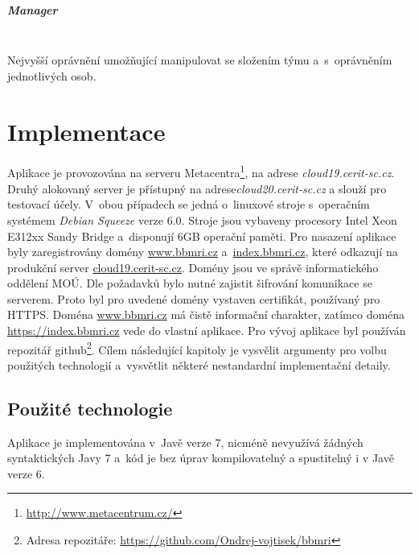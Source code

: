 \documentclass[11pt,draft,oneside]{fithesis2}
\newcommand{\paragraphNewLine}[1]{\paragraph*{#1}\mbox{}\\}
\begin{document}
\paragraphNewLine{Manager}
Nejvyšší oprávnění umožňující manipulovat se složením týmu a~s~oprávněním jednotlivých osob.











\chapter{Implementace}\label{chapter:implementation}
Aplikace je provozována na serveru Metacentra\footnote{\url{http://www.metacentrum.cz/}}, na adrese \textit{cloud19.cerit-sc.cz}. Druhý alokovaný server je přístupný na adrese\textit{cloud20.cerit-sc.cz} a slouží pro testovací účely. V~obou případech se jedná o~linuxové stroje s~operačním systémem \textit{Debian Squeeze} verze 6.0. Stroje jsou vybaveny procesory Intel Xeon E312xx Sandy Bridge a~disponují 6GB operační paměti.
Pro nasazení aplikace byly zaregistrovány domény \url{www.bbmri.cz} a~\url{index.bbmri.cz}, které odkazují na produkční server \url{cloud19.cerit-sc.cz}. Domény jsou ve správě informatického oddělení MOÚ.
Dle požadavků bylo nutné zajistit šifrování komunikace se serverem. Proto byl pro uvedené domény vystaven certifikát, používaný pro HTTPS. 
Doména \url{www.bbmri.cz} má čistě informační charakter, zatímco doména \url{https://index.bbmri.cz} vede do vlastní aplikace.
Pro vývoj aplikace byl používán repozitář github\footnote{Adresa repozitáře: \url{https://github.com/Ondrej-vojtisek/bbmri}}. 
Cílem následující kapitoly je vysvělit argumenty pro volbu použitých technologií a~vysvětlit některé nestandardní implementační detaily.


\section{Použité technologie}
Aplikace je implementována v~Javě verze 7, nicméně nevyužívá žádných syntaktických  Javy 7 a~kód je bez úprav kompilovatelný a spustitelný i v Javě verze 6. 
\end{document}
